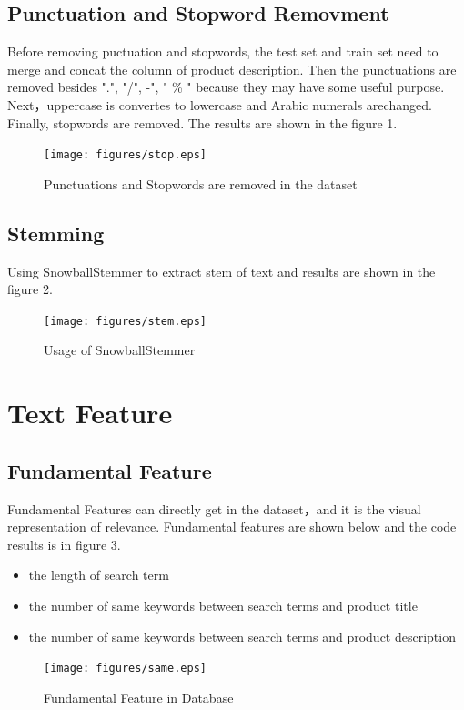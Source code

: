 \subsection{Punctuation and Stopword Removment} Before removing puctuation and stopwords, the test set and train set need to merge and concat the column of product description. Then the punctuations are removed besides ".", "/", -", " \% " because they may have some useful purpose. Next，uppercase is convertes to lowercase and  Arabic numerals arechanged. Finally, stopwords are removed. The results are shown in the figure 1.

\begin{figure}[htb]
	\centering
	\texttt{[image: figures/stop.eps]}\\
	\caption{Punctuations and Stopwords are removed in the dataset 
	}\label{straddltimeScale}
\end{figure}
\subsection{Stemming} Using SnowballStemmer to extract stem of text and results are shown in the figure 2.
\begin{figure}[htb]
	\centering
	\texttt{[image: figures/stem.eps]}
	\caption{Usage of SnowballStemmer
	}\label{straddltimeScale}
\end{figure}

\section{Text Feature} \label{sec-method}
\subsection{Fundamental Feature}	
Fundamental Features can directly get in the dataset，and it is the visual representation of relevance. Fundamental features are shown below and the code results is in figure 3.
\begin{itemize}
	\item the length of search term
	\item the number of same keywords between search terms and product title 
	\item the number of same keywords between search terms and product description
\end{itemize}
	\begin{figure}[htb]
	\centering
	\texttt{[image: figures/same.eps]}
	\caption{Fundamental Feature in Database
	}\label{straddltimeScale}
\end{figure}


